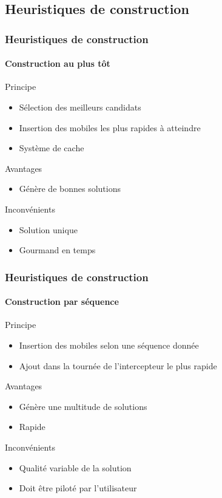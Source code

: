 \subsection{Heuristiques de construction}
\begin{frame}
	\frametitle{Heuristiques de construction}
	\framesubtitle{Construction au plus tôt}
	\begin{block}{Principe}
		\begin{itemize}
			\item Sélection des meilleurs candidats
			\item Insertion des mobiles les plus rapides à atteindre
			\item Système de cache
		\end{itemize}
	\end{block}
	\begin{exampleblock}{Avantages}
		\begin{itemize}
			\item Génère de bonnes solutions
		\end{itemize}
	\end{exampleblock}
	\begin{alertblock}{Inconvénients}
		\begin{itemize}
			\item Solution unique
			\item Gourmand en temps
		\end{itemize}
	\end{alertblock}
\end{frame}
\begin{frame}
	\frametitle{Heuristiques de construction}
	\framesubtitle{Construction par séquence}
	\begin{block}{Principe}
		\begin{itemize}
			\item Insertion des mobiles selon une séquence donnée
			\item Ajout dans la tournée de l'intercepteur le plus rapide
		\end{itemize}
	\end{block}
	\begin{exampleblock}{Avantages}
		\begin{itemize}
			\item Génère une multitude de solutions
			\item Rapide
		\end{itemize}
	\end{exampleblock}
	\begin{alertblock}{Inconvénients}
		\begin{itemize}
			\item Qualité variable de la solution
			\item Doit être piloté par l'utilisateur
		\end{itemize}
	\end{alertblock}
\end{frame}

